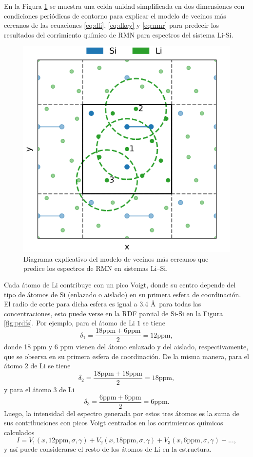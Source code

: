 En la Figura \ref{fig:viz} se muestra una celda unidad simplificada en dos
dimensiones con condiciones periódicas de contorno para explicar el modelo
de vecinos más cercanos de las ecuaciones \ref{eq:dli}, \ref{eq:dkey} y \ref{eq:nmr}
para predecir los resultados del corrimiento químico de RMN para espectros 
del sistema Li-Si.
\begin{figure}[h!]
    \centering
    \includegraphics[width=.7\textwidth]{Silicio/prediccion/resultados/nmr/viz.png}
    \caption{Diagrama explicativo del modelo de vecinos más cercanos que predice los
    espectros de RMN en sistemas Li--Si.} 
    \label{fig:viz}
\end{figure}
Cada átomo de Li contribuye con un pico Voigt, donde su centro
depende del tipo de átomos de Si (enlazado o aislado) en su primera esfera de 
coordinación. El radio de corte para dicha esfera es igual a 3.4 \AA\ para todas 
las concentraciones, esto puede verse en la RDF parcial de Si-Si en la Figura 
\ref{fig:prdfs}. Por ejemplo, para el átomo de Li $1$ se tiene
\begin{equation}
    \delta_1 = \frac{18 \text{ppm} + 6 \text{ppm}}{2} = 12 \text{ppm},
\end{equation}
donde 18 ppm y 6 ppm vienen del átomo enlazado y del aislado, respectivamente,
que se observa en su primera esfera de coordinación. De la misma manera, para 
el átomo $2$ de Li se tiene 
\begin{equation}
    \delta_2 = \frac{18 \text{ppm} + 18 \text{ppm}}{2} = 18 \text{ppm},
\end{equation}
y para el átomo $3$ de Li
\begin{equation}
    \delta_3 = \frac{6 \text{ppm} + 6 \text{ppm}}{2} = 6 \text{ppm}.
\end{equation}
Luego, la intensidad del espectro generada por estos tres átomos es la suma
de sus contribuciones con picos Voigt centrados en los corrimientos químicos
calculados
\begin{equation}
    I = V_1(x, 12 \text{ppm}, \sigma, \gamma) + V_2(x, 18 \text{ppm}, \sigma, \gamma) + V_3(x, 6 \text{ppm}, \sigma, \gamma) + ...,
\end{equation}
y así puede considerarse el resto de los átomos de Li en la estructura.

